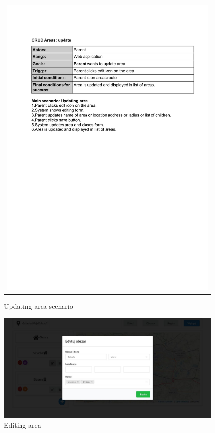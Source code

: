 \documentclass{sprawozdanie-agh}
\begin{document}
		\begin{figure}[H] 
			\centering
			\begin{tabular}{c}
				\includegraphics[width=.80\textwidth]{upA_cropped} 
			\end{tabular} 
		\caption{Updating area scenario}
		\end{figure}

		\begin{figure}[H]
			\centering
			\includegraphics[width=.80\textwidth]{editArea}
			\caption{Editing area}
		\end{figure}
\end{document}
